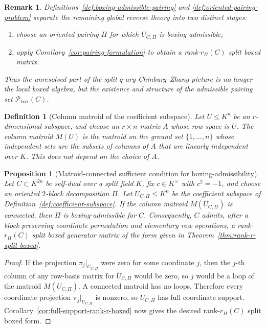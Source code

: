 \documentclass[12pt]{article}
\newtheorem{defn}{Definition}[section]
\newtheorem{prop}[theorem]{Proposition}
\newtheorem{remark}[theorem]{Remark}
\begin{document}
\begin{remark}
\rm
Definitions~\ref{def:boxing-admissible-pairing} and \ref{def:oriented-pairing-problem} separate the remaining global reverse theory into two distinct stages:
\begin{enumerate}
\item choose an oriented pairing \(\Pi\) for which \(U_{C,\Pi}\) is boxing-admissible;
\item apply Corollary~\ref{cor:pairing-formulation} to obtain a rank-\(r_\Pi(C)\) split boxed matrix.
\end{enumerate}
Thus the unresolved part of the split \(q\)-ary Chinburg--Zhang picture is no longer the local boxed algebra, but the existence and structure of the admissible pairing set \(\mathcal P_{\mathrm{box}}(C)\).
\end{remark}

\begin{defn}[Column matroid of the coefficient subspace]
\label{def:coefficient-matroid}
Let \(U\le K^n\) be an \(r\)-dimensional subspace, and choose an \(r\times n\) matrix \(A\) whose row space is \(U\). The \emph{column matroid} \(M(U)\) is the matroid on the ground set \(\{1,\dots,n\}\) whose independent sets are the subsets of columns of \(A\) that are linearly independent over \(K\). This does not depend on the choice of \(A\).
\end{defn}

\begin{prop}[Matroid-connected sufficient condition for boxing-admissibility]
\label{prop:matroid-connected-rank-r}
Let \(C\subset K^{2n}\) be self-dual over a split field \(K\), fix \(c\in K^\times\) with \(c^2=-1\), and choose an oriented \(2\)-block decomposition \(\Pi\). Let \(U_{C,\Pi}\le K^n\) be the coefficient subspace of Definition~\ref{def:coefficient-subspace}. If the column matroid \(M(U_{C,\Pi})\) is connected, then \(\Pi\) is boxing-admissible for \(C\). Consequently, \(C\) admits, after a block-preserving coordinate permutation and elementary row operations, a rank-\(r_\Pi(C)\) split boxed generator matrix of the form given in Theorem~\ref{thm:rank-r-split-boxed}.
\end{prop}

\begin{proof}
If the projection \(\pi_j|_{U_{C,\Pi}}\) were zero for some coordinate \(j\), then the \(j\)-th column of any row-basis matrix for \(U_{C,\Pi}\) would be zero, so \(j\) would be a loop of the matroid \(M(U_{C,\Pi})\). A connected matroid has no loops. Therefore every coordinate projection \(\pi_j|_{U_{C,\Pi}}\) is nonzero, so \(U_{C,\Pi}\) has full coordinate support. Corollary~\ref{cor:full-support-rank-r-boxed} now gives the desired rank-\(r_\Pi(C)\) split boxed form.
\end{proof}
\end{document}
